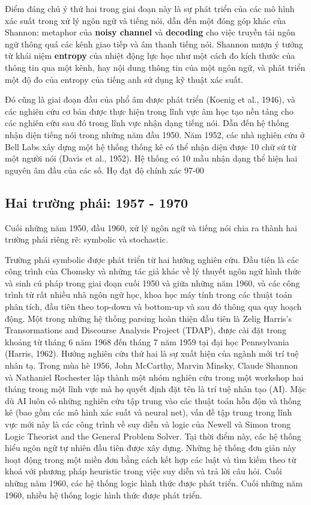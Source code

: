 Điểm đáng chú ý thứ hai trong giai đoạn này là sự phát triển của các mô hình xác suất trong xử lý ngôn ngữ và tiếng nói, dẫn đến một đóng góp khác của Shannon: metaphor của \textbf{noisy channel} và \textbf{decoding} cho việc truyền tải ngôn ngữ thông quá các kênh giao tiếp và âm thanh tiếng nói. Shannon mượn ý tưởng từ khái niệm \textbf{entropy} của nhiệt động lực học như một cách đo kích thước của thông tin qua một kênh, hay nội dung thông tin của một ngôn ngữ, và phát triển một độ đo của entropy của tiếng anh sử dụng kỹ thuật xác suất.

Đó cũng là giai đoạn đầu của phổ âm được phát triển (Koenig et al., 1946), và các nghiên cứu cơ bản được thực hiện trong lĩnh vực âm học tạo nền tảng cho các nghiên cứu sau đó trong lĩnh vực nhận dạng tiếng nói. Dẫn đến hệ thống nhận diện tiếng nói trong những năm đầu 1950. Năm 1952, các nhà nghiên cứu ở Bell Labs xây dựng một hệ thống thống kê có thể nhận diện được 10 chữ sứ từ một người nói (Davis et al., 1952). Hệ thống có 10 mẫu nhận dạng thể hiện hai nguyên âm đầu của các số. Họ đạt độ chính xác 97-00%

\subsection{Hai trường phái: 1957 - 1970}

Cuối những năm 1950, đầu 1960, xử lý ngôn ngữ và tiếng nói chia ra thành hai trường phái riêng rẽ: symbolic và stochastic.

Trường phái symbolic được phát triển từ hai hướng nghiên cứu. Đầu tiên là các công trình của Chomsky và những tác giả khác về lý thuyết ngôn ngữ hình thức và sinh cú pháp trong giai đoạn cuối 1950 và giữa những năm 1960, và các công trình từ rất nhiều nhà ngôn ngữ học, khoa học máy tính trong các thuật toán phân tích, đầu tiên theo top-down và bottom-up và sau đó thông qua quy hoạch động. Một trong những hệ thống parsing hoàn thiện đầu tiên là Zelig Harris's Transormations and Discourse Analysis Project (TDAP), được cài đặt trong khoảng từ tháng 6 năm 1968 đến tháng 7 năm 1959 tại đại học Pennsylvania (Harris, 1962). Hướng nghiên cứu thứ hai là sự xuất hiện của ngành mới trí tuệ nhân tạ. Trong mùa hè 1956, John McCarthy, Marvin Minsky, Claude Shannon và Nathaniel Rochester lập thành một nhóm nghiên cứu trong một workshop hai tháng trong một lĩnh vực mà họ quyết định đặt tên là trí tuệ nhân tạo (AI). Mặc dù AI luôn có những nghiên cứu tập trung vào các thuật toán hỗn độn và thống kê (bao gồm các mô hình xác suất và neural net), vấn đề tập trung trong lĩnh vực mới này là các công trình về suy diễn và logic của Newell và Simon trong Logic Theorist and the General Problem Solver. Tại thời điểm này, các hệ thống hiểu ngôn ngữ tự nhiên đầu tiên được xây dựng. Những hệ thống đơn giản này hoạt động trong một miền đơn bằng cách kết hợp các luật và tìm kiếm theo từ khoá với phương pháp heuristic trong việc suy diễn và trả lời câu hỏi. Cuối những năm 1960, các hệ thống logic hình thức được phát triển. Cuối những năm 1960, nhiều hệ thống logic hình thức được phát triển.

